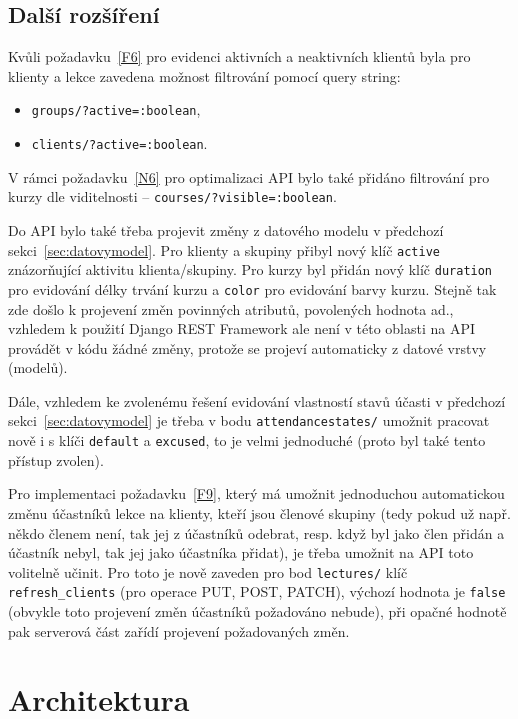\subsection{Další rozšíření}

Kvůli požadavku~\ref{F6} pro evidenci aktivních a neaktivních klientů byla pro klienty a lekce zavedena možnost filtrování pomocí query string:
\begin{itemize}
    \item \verb|groups/?active=:boolean|,
    \item \verb|clients/?active=:boolean|.
\end{itemize}

V rámci požadavku~\ref{N6} pro optimalizaci API bylo také přidáno filtrování pro kurzy dle viditelnosti -- \verb|courses/?visible=:boolean|.

Do API bylo také třeba projevit změny z datového modelu v předchozí sekci~\ref{sec:datovymodel}. Pro klienty a skupiny přibyl nový klíč \verb|active| znázorňující aktivitu klienta/skupiny. Pro kurzy byl přidán nový klíč \verb|duration| pro evidování délky trvání kurzu a \verb|color| pro evidování barvy kurzu. Stejně tak zde došlo k projevení změn povinných atributů, povolených hodnota ad., vzhledem k použití Django REST Framework ale není v této oblasti na API provádět v kódu žádné změny, protože se projeví automaticky z datové vrstvy (modelů).

Dále, vzhledem ke zvolenému řešení evidování vlastností stavů účasti v předchozí sekci~\ref{sec:datovymodel} je třeba v bodu \verb|attendancestates/| umožnit pracovat nově i s klíči \verb|default| a \verb|excused|, to je velmi jednoduché (proto byl také tento přístup zvolen).

Pro implementaci požadavku~\ref{F9}, který má umožnit jednoduchou automatickou změnu účastníků lekce na klienty, kteří jsou členové skupiny (tedy pokud už např. někdo členem není, tak jej z účastníků odebrat, resp. když byl jako člen přidán a účastník nebyl, tak jej jako účastníka přidat), je třeba umožnit na API toto volitelně učinit. Pro toto je nově zaveden pro bod \verb|lectures/| klíč \verb|refresh_clients| (pro operace PUT, POST, PATCH), výchozí hodnota je \verb|false| (obvykle toto projevení změn účastníků požadováno nebude), při opačné hodnotě pak serverová část zařídí projevení požadovaných změn. 

\section{Architektura}

